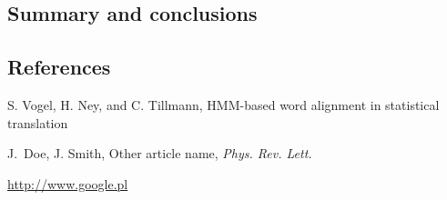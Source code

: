 \documentclass[final]{beamer}
\begin{document}
\begin{frame}[t]
\begin{multicols}{3}
\section{Summary and conclusions}






\subsection{References}

\begin{thebibliography}{99}

 S. Vogel, H. Ney, and C. Tillmann, HMM-based word alignment in statistical translation

 J.~Doe, J. Smith, Other article name, \textit{Phys. Rev. Lett.}

 \url{http://www.google.pl}

\end{thebibliography}

\end{multicols}

\end{frame}
\end{document}
